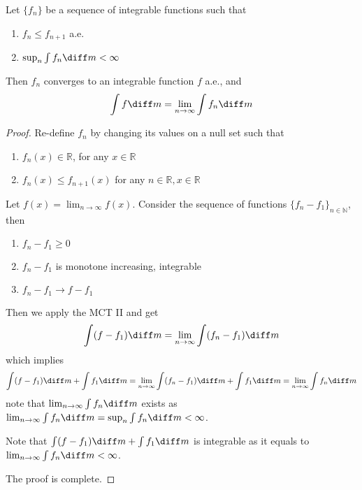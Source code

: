 \begin{theorem}[MCT II]
Let $\{f_n\}$ be a sequence of integrable functions such that
\begin{enumerate}
\item
$f_n\le f_{n+1}$ a.e.
\item
$\sup_n\int f_n\diff m<\infty$
\end{enumerate}
Then $f_n$ converges to an integrable function $f$ a.e., and
\[
\int f\diff m = \lim_{n\to\infty}\int f_n\diff m
\]
\end{theorem}
\begin{proof}
Re-define $f_n$ by changing its values on a null set such that
\begin{enumerate}
\item
$f_n(x)\in\mathbb{R}$, for any $x\in\mathbb{R}$
\item
$f_n(x)\le f_{n+1}(x)$ for any $n\in\mathbb{R},x\in\mathbb{R}$
\end{enumerate}
Let $f(x) = \lim_{n\to\infty}f(x)$.
Consider the sequence of functions $\{f_n - f_1\}_{n\in\mathbb{N}}$, then
\begin{enumerate}
\item
$f_n-f_1\ge0$
\item
$f_n-f_1$ is monotone increasing, integrable
\item
$f_n-f_1\to f-f_1$
\end{enumerate}
Then we apply the MCT II and get
\[
\int(f-f_1)\diff m =\lim_{n\to\infty}\int(f_n-f_1)\diff m
\]
which implies
\[
\int(f-f_1)\diff m+\int f_1\diff m
=
\lim_{n\to\infty}\int(f_n-f_1)\diff m+\int f_1\diff m
=
\lim_{n\to\infty}\int f_n\diff m 
\]
note that $\lim_{n\to\infty}\int f_n\diff m $ exists as $\lim_{n\to\infty}\int f_n\diff m =\sup_n\int f_n\diff m<\infty$.

Note that $\int(f-f_1)\diff m+\int f_1\diff m$ is integrable as it equals to $\lim_{n\to\infty}\int f_n\diff m<\infty$.

The proof is complete.
\end{proof}

















